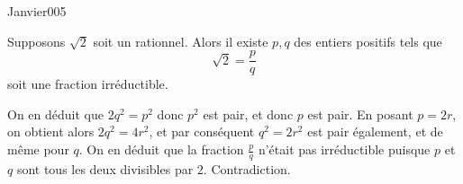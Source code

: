 \begin{corrige}{Janvier005}


Supposons $\sqrt 2$ soit un rationnel. Alors il existe $p, q$ des
entiers positifs tels que
\begin{equation*}
  \sqrt 2 = \frac pq
\end{equation*}
soit une fraction irréductible.

On en déduit que $2 q^2 = p^2$ donc $p^2$ est pair, et donc $p$ est
pair. En posant $p = 2r$, on obtient alors $2 q^2 = 4 r^2$, et par
conséquent $q^2 = 2r^2$ est pair également, et de même pour $q$. On en
déduit que la fraction $\frac pq$ n'était pas irréductible puisque $p$
et $q$ sont tous les deux divisibles par $2$. Contradiction.

\end{corrige}
